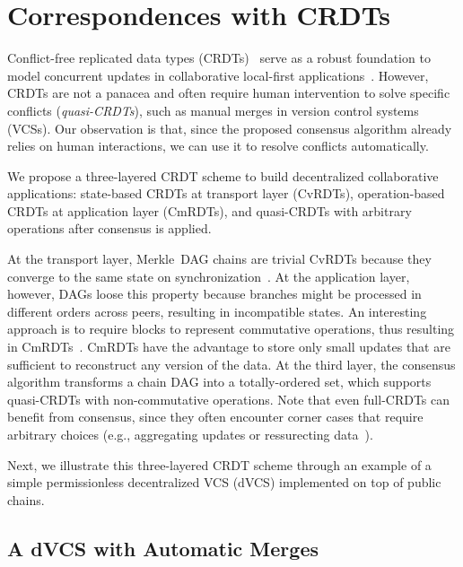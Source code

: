\documentclass[10pt,journal,compsoc]{IEEEtran}
\begin{document}
\section{Correspondences with CRDTs}
\label{sec.crdts}

Conflict-free replicated data types (CRDTs)~\cite{p2p.crdts} serve as a robust
foundation to model concurrent updates in collaborative local-first
applications~\cite{p2p.local}.
However, CRDTs are not a panacea and often require human intervention to solve
specific conflicts (\emph{quasi-CRDTs}), such as manual merges in version
control systems (VCSs).
%
Our observation is that, since the proposed consensus algorithm already relies
on human interactions, we can use it to resolve conflicts automatically.

We propose a three-layered CRDT scheme to build decentralized collaborative
applications:
    state-based CRDTs at transport layer (CvRDTs),
    operation-based CRDTs at application layer (CmRDTs), and
    quasi-CRDTs with arbitrary operations after consensus is applied.

At the transport layer, Merkle~DAG chains are trivial CvRDTs because they
converge to the same state on synchronization~\cite{p2p.merkle-crdts}.
%
At the application layer, however, DAGs loose this property because branches
might be processed in different orders across peers, resulting in incompatible
states.
An interesting approach is to require blocks to represent commutative
operations, thus resulting in CmRDTs~\cite{p2p.merkle-crdts}.
%
CmRDTs have the advantage to store only small updates that are sufficient to
reconstruct any version of the data.
%
At the third layer, the consensus algorithm transforms a chain DAG into a
totally-ordered set, which supports quasi-CRDTs with non-commutative
operations.
Note that even full-CRDTs can benefit from consensus, since they often
encounter corner cases that require arbitrary choices (e.g., aggregating
updates or ressurecting data~\cite{p2p.automerge}).

Next, we illustrate this three-layered CRDT scheme through an example of a
simple permissionless decentralized VCS (dVCS) implemented on top of public
chains.

\subsection{A dVCS with Automatic Merges}
\end{document}
